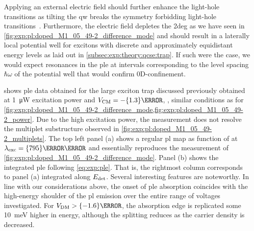 Applying an external electric field should further enhance the light-hole transitions as tilting the \gls{qw} breaks the symmetry forbidding light-hole transitions~\cite{Collins1986,Collins1987}.
Furthermore, the electric field depletes the \gls{2deg} as we have seen in \cref{fig:exp:pl:doped_M1_05_49-2_difference_mode} and should result in a laterally local potential well for excitons with discrete and approximately equidistant energy levels as laid out in \cref{subsec:exp:theory:qcse:trap}.
If such were the case, we would expect resonances in the \gls{ple} at intervals corresponding to the level spacing $\hbar\omega$ of the potential well that would confirm 0D-confinement.

 shows \gls{ple} data obtained for the large exciton trap discussed previously obtained at \qty{1}{\micro\watt} excitation power and $\VCM = -\qty{1.3}{\volt}$, \ie, similar conditions as for \cref{fig:exp:pl:doped_M1_05_49-2_difference_mode,fig:exp:pl:doped_M1_05_49-2_power}.
Due to the high excitation power, the measurement does not resolve the multiplet substructure observed in \cref{fig:exp:pl:doped_M1_05_49-2_multiplets}.
The top left panel (a) shows a regular \gls{pl} map as function of \VDM at $\lambda_{\mr{exc}} = \qty{795}{\nano\meter}$ and essentially reproduces the measurement of \cref{fig:exp:pl:doped_M1_05_49-2_difference_mode}.
Panel (b) shows the integrated \gls{ple} following \cref{eq:exp:ple}.
That is, the rightmost column corresponds to panel (a) integrated along $E_{\mathrm{det}}$.
Several interesting features are noteworthy.
In line with our considerations above, the onset of \gls{ple} absorption coincides with the high-energy shoulder of the \gls{pl} emission over the entire range of voltages investigated.
For $\VDM > \qty{-1.6}{\volt}$, the absorption edge is replicated some \qty{10}{\milli\electronvolt} higher in energy, although the splitting reduces as the carrier density is decreased.

